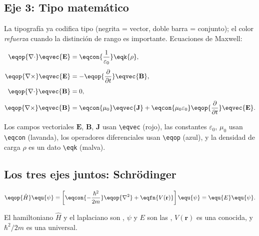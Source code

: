 \subsection{Eje 3: Tipo matemático}

La tipografía ya codifica tipo (negrita = vector, doble barra = conjunto);
el color \textit{refuerza} cuando la distinción de rango es importante.
Ecuaciones de Maxwell:

\begin{align}
\eqop{\nabla \cdot} \eqvec{\mathbf{E}}
  &= \eqcon{\frac{1}{\varepsilon_0}} \eqk{\rho},
  \label{eq:gauss} \\[4pt]
\eqop{\nabla \times} \eqvec{\mathbf{E}}
  &= -\eqop{\frac{\partial}{\partial t}} \eqvec{\mathbf{B}},
  \label{eq:faraday} \\[4pt]
\eqop{\nabla \cdot} \eqvec{\mathbf{B}}
  &= 0,
  \label{eq:gauss-mag} \\[4pt]
\eqop{\nabla \times} \eqvec{\mathbf{B}}
  &= \eqcon{\mu_0} \eqvec{\mathbf{J}}
   + \eqcon{\mu_0 \varepsilon_0}
     \eqop{\frac{\partial}{\partial t}} \eqvec{\mathbf{E}}.
  \label{eq:ampere}
\end{align}

Los campos vectoriales $\mathbf{E}$, $\mathbf{B}$, $\mathbf{J}$ usan
\texttt{\textbackslash eqvec} (rojo), las constantes $\varepsilon_0$, $\mu_0$ usan
\texttt{\textbackslash eqcon} (lavanda), los operadores diferenciales usan \texttt{\textbackslash eqop}
(azul), y la densidad de carga $\rho$ es un dato \texttt{\textbackslash eqk} (malva).

\subsection{Los tres ejes juntos: Schrödinger}

\begin{equation}
\label{eq:schrodinger}
\eqop{\hat{H}} \equ{\psi}
=
\left[
  \eqcon{-\frac{\hbar^2}{2m}} \eqop{\nabla^2}
  + \eqfn{V(\mathbf{r})}
\right] \equ{\psi}
=
\equ{E} \equ{\psi}.
\end{equation}

El hamiltoniano $\hat{H}$ y el laplaciano son ,
$\psi$ y $E$ son las ,
$V(\mathbf{r})$ es una  conocida,
y $\hbar^2/2m$ es una  universal.

